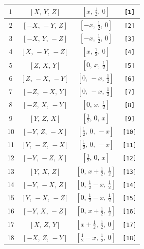 \documentclass[fleqn,8pt]{jsarticle}
\begin{document}
\begin{longtable}{cccc}
1 & $\left[ X,\, Y,\, Z \right]$ & $\left[ x,\, \frac{1}{2},\, 0 \right]$ & {\tt [1]} \\ \hline
2 & $\left[ - X,\, - Y,\, Z \right]$ & $\left[ - x,\, \frac{1}{2},\, 0 \right]$ & {\tt [2]} \\ \hline
3 & $\left[ - X,\, Y,\, - Z \right]$ & $\left[ - x,\, \frac{1}{2},\, 0 \right]$ & {\tt [3]} \\ \hline
4 & $\left[ X,\, - Y,\, - Z \right]$ & $\left[ x,\, \frac{1}{2},\, 0 \right]$ & {\tt [4]} \\ \hline
5 & $\left[ Z,\, X,\, Y \right]$ & $\left[ 0,\, x,\, \frac{1}{2} \right]$ & {\tt [5]} \\ \hline
6 & $\left[ Z,\, - X,\, - Y \right]$ & $\left[ 0,\, - x,\, \frac{1}{2} \right]$ & {\tt [6]} \\ \hline
7 & $\left[ - Z,\, - X,\, Y \right]$ & $\left[ 0,\, - x,\, \frac{1}{2} \right]$ & {\tt [7]} \\ \hline
8 & $\left[ - Z,\, X,\, - Y \right]$ & $\left[ 0,\, x,\, \frac{1}{2} \right]$ & {\tt [8]} \\ \hline
9 & $\left[ Y,\, Z,\, X \right]$ & $\left[ \frac{1}{2},\, 0,\, x \right]$ & {\tt [9]} \\ \hline
10 & $\left[ - Y,\, Z,\, - X \right]$ & $\left[ \frac{1}{2},\, 0,\, - x \right]$ & {\tt [10]} \\ \hline
11 & $\left[ Y,\, - Z,\, - X \right]$ & $\left[ \frac{1}{2},\, 0,\, - x \right]$ & {\tt [11]} \\ \hline
12 & $\left[ - Y,\, - Z,\, X \right]$ & $\left[ \frac{1}{2},\, 0,\, x \right]$ & {\tt [12]} \\ \hline
13 & $\left[ Y,\, X,\, Z \right]$ & $\left[ 0,\, x + \frac{1}{2},\, \frac{1}{2} \right]$ & {\tt [13]} \\ \hline
14 & $\left[ - Y,\, - X,\, Z \right]$ & $\left[ 0,\, \frac{1}{2} - x,\, \frac{1}{2} \right]$ & {\tt [14]} \\ \hline
15 & $\left[ Y,\, - X,\, - Z \right]$ & $\left[ 0,\, \frac{1}{2} - x,\, \frac{1}{2} \right]$ & {\tt [15]} \\ \hline
16 & $\left[ - Y,\, X,\, - Z \right]$ & $\left[ 0,\, x + \frac{1}{2},\, \frac{1}{2} \right]$ & {\tt [16]} \\ \hline
17 & $\left[ X,\, Z,\, Y \right]$ & $\left[ x + \frac{1}{2},\, \frac{1}{2},\, 0 \right]$ & {\tt [17]} \\ \hline
18 & $\left[ - X,\, Z,\, - Y \right]$ & $\left[ \frac{1}{2} - x,\, \frac{1}{2},\, 0 \right]$ & {\tt [18]} \\ \hline

\end{longtable}
\end{document}
